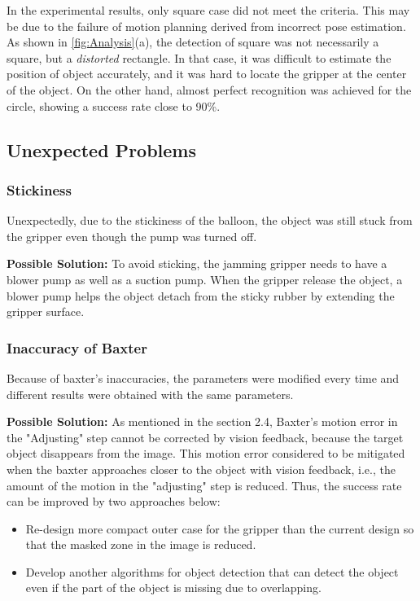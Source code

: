 \documentclass[conference,a4paper]{IEEEtran}
\begin{document}
In the experimental results, only square case did not meet the criteria. This may be due to the failure of motion planning derived from incorrect pose estimation. As shown in \autoref{fig:Analysis}(a), the detection of square was not necessarily a square, but a {\it distorted} rectangle. In that case, it was difficult to estimate the position of object accurately, and it was hard to locate the gripper at the center of the object. On the other hand, almost perfect recognition was achieved for the circle, showing a success rate close to 90\%.


\subsection{Unexpected Problems}

\subsubsection{Stickiness}
Unexpectedly, due to the stickiness of the balloon, the object was still stuck from the gripper even though the pump was turned off.

 {\bf Possible Solution:} To avoid sticking, the jamming gripper needs to have a blower pump as well as a suction pump. When the gripper release the object, a blower pump helps the object detach from the sticky rubber by extending the gripper surface.
\subsubsection{Inaccuracy of Baxter}
Because of baxter's inaccuracies, the parameters were modified every time and different results were obtained with the same parameters.

 {\bf Possible Solution:} As mentioned in the section 2.4, Baxter's motion error in the "Adjusting" step cannot be corrected by vision feedback, because the target object disappears from the image. This motion error considered to be mitigated when the baxter approaches closer to the object with vision feedback, i.e., the amount of the motion in the 
"adjusting" step is reduced. Thus, the success rate can be improved by two approaches below:
 \begin{itemize} 
\item Re-design more compact outer case for the gripper than the current design so that the masked zone in the image is reduced.
\item Develop another algorithms for object detection that can detect the object even if the part of the object is missing due to overlapping.
\end{itemize}
\end{document}
